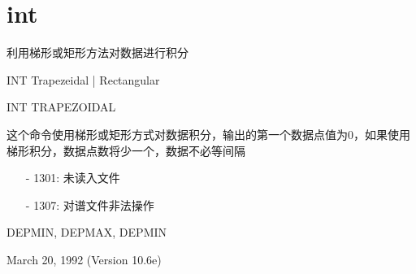 \section{int}
\label{cmd:int}

利用梯形或矩形方法对数据进行积分

INT Trapezeidal | Rectangular

INT TRAPEZOIDAL

这个命令使用梯形或矩形方式对数据积分，输出的第一个数据点值为0，如果使用梯形积分，数据点数将少一个，数据不必等间隔

\begin{itemize}
\item[-]1301: 未读入文件
\item[-]1307: 对谱文件非法操作
\end{itemize}

DEPMIN, DEPMAX, DEPMIN

March 20, 1992 (Version 10.6e)
